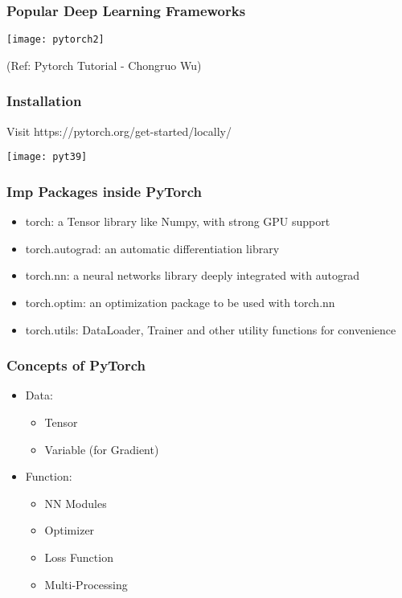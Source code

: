 \begin{frame}[fragile] \frametitle{Popular Deep Learning Frameworks}


\begin{center}
\texttt{[image: pytorch2]}
\end{center}

  {\tiny (Ref: Pytorch Tutorial - Chongruo Wu)}

\end{frame}



\begin{frame}[fragile] \frametitle{Installation}

Visit https://pytorch.org/get-started/locally/

\begin{center}
\texttt{[image: pyt39]}%
\end{center}


\end{frame}


\begin{frame}[fragile] \frametitle{Imp Packages inside PyTorch}
\begin{itemize}
\item  torch: a Tensor library like Numpy, with strong GPU support
\item torch.autograd: an automatic differentiation library 
\item torch.nn: a neural networks library deeply integrated with autograd 
\item torch.optim: an optimization package to be used with torch.nn
\item torch.utils: DataLoader, Trainer and other utility functions for convenience
\end{itemize}
\end{frame}


\begin{frame}[fragile] \frametitle{Concepts of PyTorch}
\begin{itemize}
\item Data:
\begin{itemize}
\item Tensor
\item Variable (for Gradient)
\end{itemize}
\item Function:
\begin{itemize}
\item   NN Modules
\item   Optimizer
\item   Loss Function
\item   Multi-Processing
\end{itemize}
\end{itemize}
\end{frame}

